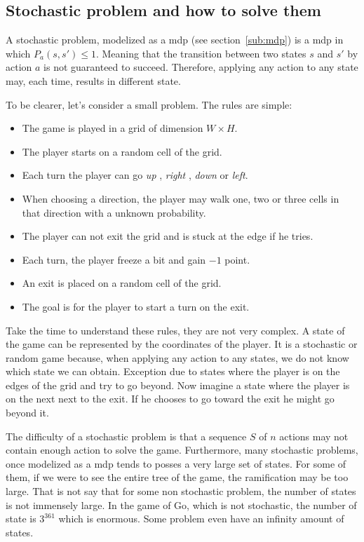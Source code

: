 \subsection{Stochastic problem and how to solve them}%
\label{sub:stochastic_problem_and_how_to_solve_them}

A stochastic problem, modelized as a \gls{mdp} (see section~\ref{sub:mdp}) is a \gls{mdp} in which \(P_{a}(s, s') \leq 1\).
Meaning that the transition between two states \(s\) and \(s'\) by action \(a\) is not guaranteed to succeed.
Therefore, applying any action to any state may, each time, results in different state.

To be clearer, let's consider a small problem.
The rules are simple:

\begin{itemize}
    \item The game is played in a grid of dimension \(W \times H\).
    \item The player starts on a random cell of the grid.
    \item Each turn the player can go \textit{up} , \textit{right} , \textit{down} or \textit{left}.
    \item When choosing a direction, the player may walk one, two or three cells in that direction with a unknown probability.
    \item The player can not exit the grid and is stuck at the edge if he tries.
    \item Each turn, the player freeze a bit and gain \(-1\) point.
    \item An exit is placed on a random cell of the grid.
    \item The goal is for the player to start a turn on the exit.
\end{itemize}

Take the time to understand these rules, they are not very complex.
A state of the game can be represented by the coordinates of the player.
It is a stochastic or random game because, when applying any action to any states, we do not know which state we can obtain.
Exception due to states where the player is on the edges of the grid and try to go beyond.
Now imagine a state where the player is on the next next to the exit.
If he chooses to go toward the exit he might go beyond it.

The difficulty of a stochastic problem is that a sequence \(S\) of \(n\) actions may not contain enough action to solve the game.
Furthermore, many stochastic problems, once modelized as a \gls{mdp} tends to posses a very large set of states.
For some of them, if we were to see the entire tree of the game, the ramification may be too large.
That is not say that for some non stochastic problem, the number of states is not immensely large.
In the game of Go, which is not stochastic, the number of state is \(3^{361}\) which is enormous.
Some problem even have an infinity amount of states.

